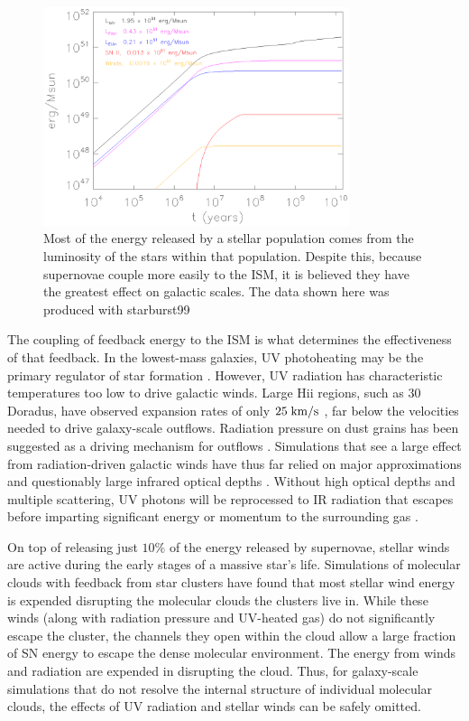 \begin{figure}
    \includegraphics[width=0.8\textwidth]{FB_budget.ps}
    \caption[Stellar feedback energy budget]{Most of the energy released by a
    stellar population comes from the luminosity of the stars within that
    population.  Despite this, because supernovae couple more easily to the ISM,
    it is believed they have the greatest effect on galactic scales.  The data
    shown here was produced with {\sc starburst99} \citep{Leitherer1999}}
\end{figure}

The coupling of feedback energy to the ISM is what determines the effectiveness
of that feedback.  In the lowest-mass galaxies, UV photoheating may be the
primary regulator of star formation \citep{Efstathiou1992}.    However, UV
radiation has characteristic temperatures too low to drive galactic winds.
Large {\sc Hii} regions, such as 30 Doradus, have observed expansion rates of
only $25\;\rm{km/s}$ \citep{Chu1994}, far below the velocities needed to drive
galaxy-scale outflows.  Radiation pressure on dust grains has been suggested as
a driving mechanism for outflows \citep{Murray2011}.  Simulations that see a
large effect from radiation-driven galactic winds have thus far relied on major approximations
\citep{Roskar2014,Agertz2015} and questionably large infrared optical depths
\citep{Hopkins2014}.  Without high optical depths and multiple scattering, UV
photons will be reprocessed to IR radiation that escapes before imparting significant
energy or momentum to the surrounding gas \citep{Dale2005,Walch2012,Krumholz2013}.

On top of releasing just $10\%$ of the energy released by supernovae, stellar
winds are active during the early stages of a massive star's life.   Simulations
of molecular clouds with feedback from star clusters
\citep{Gendelev2012,Rogers2013} have found that most stellar wind energy is
expended disrupting the molecular clouds the clusters live in.  While these
winds (along with radiation pressure and UV-heated gas) do not significantly
escape the cluster, the channels they open within the cloud allow a large
fraction of SN energy to escape the dense molecular environment. The energy from
winds and radiation are expended in disrupting the cloud.  Thus, for
galaxy-scale simulations that do not resolve the internal structure of
individual molecular clouds, the effects of UV radiation and stellar winds can
be safely omitted.

